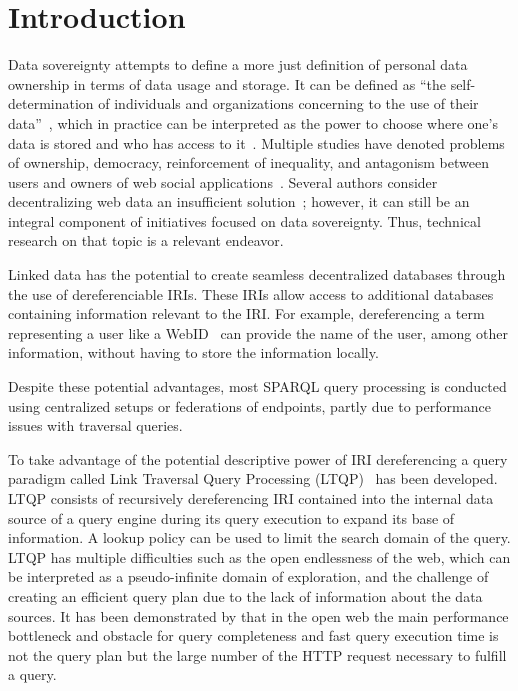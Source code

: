 \section{Introduction}

Data sovereignty attempts to define a more just definition of personal data ownership in terms of data usage and storage.
It can be defined as ``the self-determination of individuals and organizations concerning to the use of their data''~\cite{verstraete2022solid},
which in practice can be interpreted as the power to choose where one's data is stored and who has access to it~\cite{verstraete2022solid}.
Multiple studies have denoted problems of ownership, democracy, reinforcement of inequality, and antagonism between users and owners of web social applications~\cite{Terranova2000FreeLP, Curran2016ch1, Sevignani2013, 9663788}.
Several authors consider decentralizing web data an insufficient solution~\cite{9663788, Curran2016ch1}; however, it can still be an integral component of initiatives focused on data sovereignty. Thus, technical research on that topic is a relevant endeavor.

Linked data has the potential to create seamless decentralized databases through the use of dereferenciable IRIs.
These IRIs allow access to additional databases containing information relevant to the IRI.
For example, dereferencing a term representing a user like a WebID~ can provide the name of the user, among other information, without having 
to store the information locally.
\iffalse
Such data publication paradigm gives the opportunity to potentially break down data silos~\cite{verstraete2022solid},
and empowers users by reducing the need for indexing strategies to find relevant information about a term. 
Furthermore, it can help address legal and ethical concerns around data centralization, a topic of actuality in multiple world regions.
\fi
Despite these potential advantages, most SPARQL query processing is conducted using centralized setups or federations of endpoints, partly due to performance issues with traversal queries.

To take advantage of the potential descriptive power of IRI dereferencing a query paradigm called Link Traversal Query Processing (LTQP)~\cite{Hartig2012} has been developed.
LTQP consists of recursively dereferencing IRI contained into the internal data source of a query engine during its query execution to expand its base of information.
A lookup policy can be used to limit the search domain of the query.
LTQP has multiple difficulties such as the open endlessness of the web, which can be interpreted as a pseudo-infinite domain of exploration,
and the challenge of creating an efficient query plan due to the lack of information about the data sources. 
It has been demonstrated by \citeauthor{hartig2016walking} that in the open web the main performance bottleneck and obstacle for query completeness and fast query execution time is not the query plan but the large number of the HTTP request necessary to fulfill a query.

